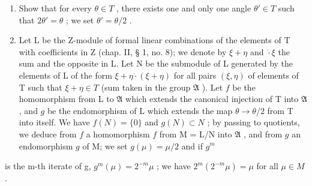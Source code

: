 \begin{enumerate}
\def\labelenumi{\alph{enumi})}
\item
  Show that for every \(\theta \in T\) , there exists one and only one angle \(\theta' \in T\) such that \(2\theta' = \theta\) ; we set \(\theta' = \theta/2\) .
\item
  Let L be the Z-module of formal linear combinations of the elements of T with coefficients in Z (chap. II, § 1, no. 8); we denote by \(\xi + \eta\) and \(\dot{\cdot} \xi\) the sum and the opposite in L. Let N be the submodule of L generated by the elements of L of the form \(\xi + \eta \dot{\cdot} (\xi + \eta)\) for all pairs \((\xi, \eta)\) of elements of T such that \(\xi + \eta \in T\) (sum taken in the group \(\mathfrak{A}\) ). Let \(f\) be the homomorphism from L to \(\mathfrak{A}\) which extends the canonical injection of T into \(\mathfrak{A}\) , and \(g\) be the endomorphism of L which extends the map \(\theta \to \theta/2\) from T into itself. We have \(f(N) = \{0\}\) and \(g(N) \subset N\) ; by passing to quotients, we deduce from \(f\) a homomorphism \(f\) from M = L/N into \(\mathfrak{A}\) , and from \(g\) an endomorphism \(g\) of M; we set \(g(\mu) = \mu/2\) and if \(g^m\)
\end{enumerate}

is the m-th iterate of g, \(g^{m}(\mu) = 2^{-m}\mu\) ; we have \(2^{m}(2^{-m}\mu) = \mu\) for all \(\mu \in M\) .

